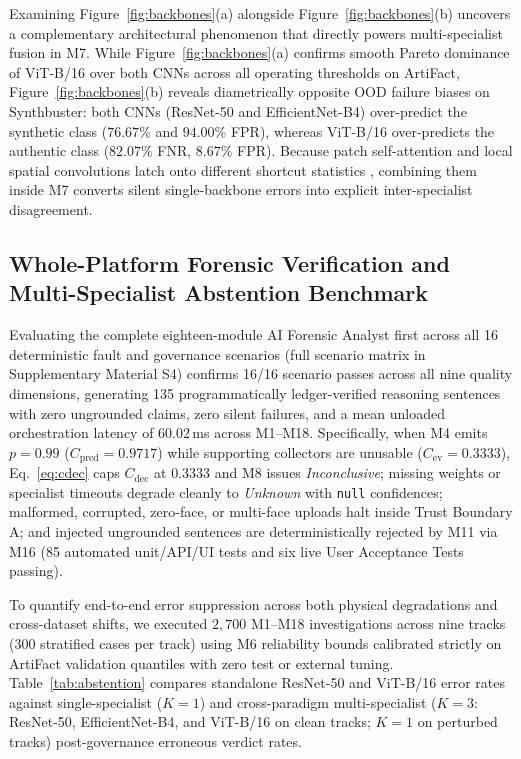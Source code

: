 \documentclass[final,5p,times,twocolumn,numafflabel]{elsarticle}
\begin{document}
Examining Figure~\ref{fig:backbones}(a) alongside Figure~\ref{fig:backbones}(b) uncovers a complementary architectural phenomenon that directly powers multi-specialist fusion in M7. While Figure~\ref{fig:backbones}(a) confirms smooth Pareto dominance of ViT-B/16 over both CNNs across all operating thresholds on ArtiFact, Figure~\ref{fig:backbones}(b) reveals diametrically opposite OOD failure biases on Synthbuster: both CNNs (ResNet-50 and EfficientNet-B4) over-predict the synthetic class ($76.67\%$ and $94.00\%$ FPR), whereas ViT-B/16 over-predicts the authentic class ($82.07\%$ FNR, $8.67\%$ FPR). Because patch self-attention and local spatial convolutions latch onto different shortcut statistics \cite{Maiano_2026}, combining them inside M7 converts silent single-backbone errors into explicit inter-specialist disagreement.

\subsection{Whole-Platform Forensic Verification and Multi-Specialist Abstention Benchmark}
\label{subsec:platform}

Evaluating the complete eighteen-module AI Forensic Analyst first across all 16 deterministic fault and governance scenarios (full scenario matrix in Supplementary Material S4) confirms 16/16 scenario passes across all nine quality dimensions, generating 135 programmatically ledger-verified reasoning sentences with zero ungrounded claims, zero silent failures, and a mean unloaded orchestration latency of $60.02$\,ms across M1--M18. Specifically, when M4 emits $p = 0.99$ ($C_{\text{pred}} = 0.9717$) while supporting collectors are unusable ($C_{\text{ev}} = 0.3333$), Eq.~\eqref{eq:cdec} caps $C_{\text{dec}}$ at $0.3333$ and M8 issues \textit{Inconclusive}; missing weights or specialist timeouts degrade cleanly to \textit{Unknown} with \texttt{null} confidences; malformed, corrupted, zero-face, or multi-face uploads halt inside Trust Boundary A; and injected ungrounded sentences are deterministically rejected by M11 via M16 (85 automated unit/API/UI tests and six live User Acceptance Tests passing).

To quantify end-to-end error suppression across both physical degradations and cross-dataset shifts, we executed $2{,}700$ M1--M18 investigations across nine tracks ($300$ stratified cases per track) using M6 reliability bounds calibrated strictly on ArtiFact validation quantiles with zero test or external tuning. Table~\ref{tab:abstention} compares standalone ResNet-50 and ViT-B/16 error rates against single-specialist ($K = 1$) and cross-paradigm multi-specialist ($K = 3$: ResNet-50, EfficientNet-B4, and ViT-B/16 on clean tracks; $K = 1$ on perturbed tracks) post-governance erroneous verdict rates.
\end{document}

